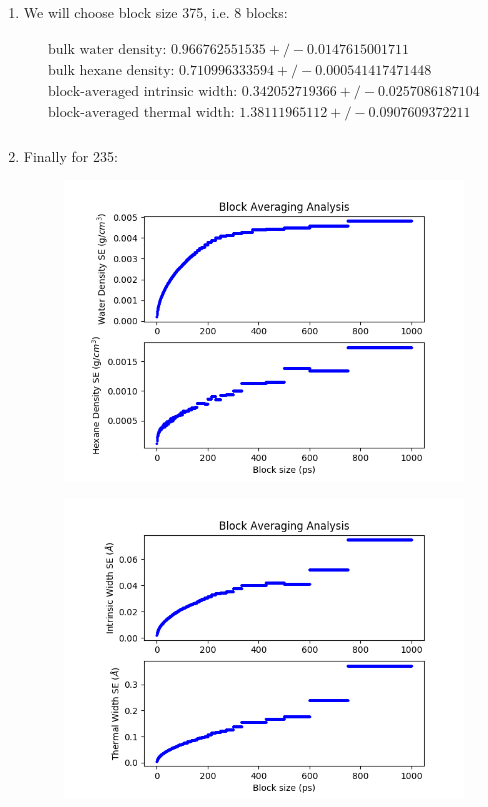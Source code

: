 \documentclass[12pt,reqno]{amsart}
\numberwithin{equation}{section}
\begin{document}
\begin{enumerate}
\item We will choose block size 375, i.e. 8 blocks: 

\begin{align}
\begin{split}
\text{bulk water density: } 0.966762551535  +/- 0.0147615001711 \\
\text{bulk hexane density: } 0.710996333594  +/- 0.000541417471448\\
\text{block-averaged intrinsic width: } 0.342052719366  +/- 0.0257086187104\\
\text{block-averaged thermal width: } 1.38111965112  +/- 0.0907609372211 \\
\end{split}
\end{align} 

\item Finally for 235:  

\begin{figure}[H]
\centering
\includegraphics[scale=0.6]{density_profile_block_averaging_1_full-235-1bead}
\end{figure}

\begin{figure}[H]
\centering
\includegraphics[scale=0.6]{density_profile_block_averaging_2_full-235-1bead}
\end{figure}


\end{enumerate}
\end{document}
